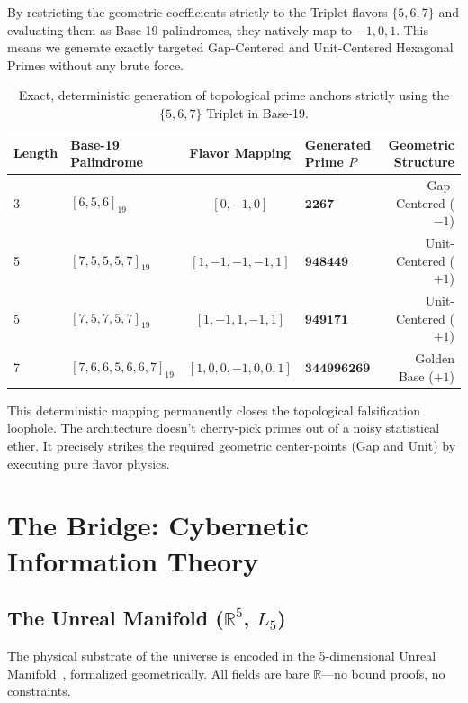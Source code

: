 By restricting the geometric coefficients strictly to the Triplet flavors $\{5, 6, 7\}$ and evaluating them as Base-19 palindromes, they natively map to $-1, 0, 1$. This means we generate exactly targeted Gap-Centered and Unit-Centered Hexagonal Primes without any brute force.

\begin{table}[H]
\centering
\begin{tabular}{@{}llclr@{}}
\toprule
\textbf{Length} & \textbf{Base-19 Palindrome} & \textbf{Flavor Mapping} & \textbf{Generated Prime $P$} & \textbf{Geometric Structure} \\
\midrule
3 & $[6, 5, 6]_{19}$ & $[0, -1, 0]$ & $\mathbf{2267}$ & Gap-Centered ($-1$) \\
5 & $[7, 5, 5, 5, 7]_{19}$ & $[1, -1, -1, -1, 1]$ & $\mathbf{948449}$ & Unit-Centered ($+1$) \\
5 & $[7, 5, 7, 5, 7]_{19}$ & $[1, -1, 1, -1, 1]$ & $\mathbf{949171}$ & Unit-Centered ($+1$) \\
7 & $[7, 6, 6, 5, 6, 6, 7]_{19}$ & $[1, 0, 0, -1, 0, 0, 1]$ & $\mathbf{344996269}$ & Golden Base ($+1$) \\
\bottomrule
\end{tabular}
\caption{Exact, deterministic generation of topological prime anchors strictly using the $\{5, 6, 7\}$ Triplet in Base-19.}
\end{table}

This deterministic mapping permanently closes the topological falsification loophole. The architecture doesn't cherry-pick primes out of a noisy statistical ether. It precisely strikes the required geometric center-points (Gap and Unit) by executing pure flavor physics.


\section{The Bridge: Cybernetic Information Theory}

\subsection{The Unreal Manifold ($\mathbb{R}^5$, $L_5$)}

The physical substrate of the universe is encoded in the 5-dimensional Unreal Manifold~\cite{GoldenTetrahedron}, formalized geometrically. All fields are bare $\mathbb{R}$---no bound proofs, no constraints.

